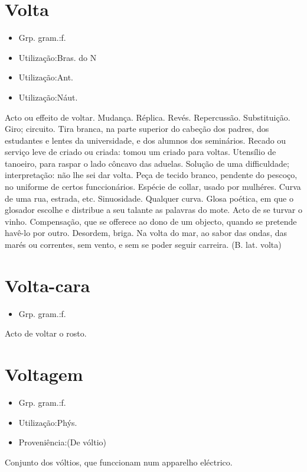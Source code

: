 \documentclass{article}
\begin{document}
\section{Volta}
\begin{itemize}
\item {Grp. gram.:f.}
\end{itemize}
\begin{itemize}
\item {Utilização:Bras. do N}
\end{itemize}
\begin{itemize}
\item {Utilização:Ant.}
\end{itemize}
\begin{itemize}
\item {Utilização:Náut.}
\end{itemize}
Acto ou effeito de voltar.
Mudança.
Réplica.
Revés.
Repercussão.
Substituição.
Giro; circuito.
Tira branca, na parte superior do cabeção dos padres, dos estudantes e lentes da universidade, e dos alumnos dos seminários.
Recado ou serviço leve de criado ou criada: \textunderscore tomou um criado para voltas\textunderscore .
Utensílio de tanoeiro, para raspar o lado côncavo das aduelas.
Solução de uma difficuldade; interpretação: \textunderscore não lhe sei dar volta\textunderscore .
Peça de tecido branco, pendente do pescoço, no uniforme de certos funccionários.
Espécie de collar, usado por mulhéres.
Curva de uma rua, estrada, etc.
Sinuosidade.
Qualquer curva.
Glosa poética, em que o glosador escolhe e distribue a seu talante as palavras do mote.
Acto de se turvar o vinho.
Compensação, que se offerece ao dono de um objecto, quando se pretende havê-lo por outro.
Desordem, briga.
\textunderscore Na volta do mar\textunderscore , ao sabor das ondas, das marés ou correntes, sem vento, e sem se poder seguir carreira.
(B. lat. \textunderscore volta\textunderscore )
\section{Volta-cara}
\begin{itemize}
\item {Grp. gram.:f.}
\end{itemize}
Acto de voltar o rosto.
\section{Voltagem}
\begin{itemize}
\item {Grp. gram.:f.}
\end{itemize}
\begin{itemize}
\item {Utilização:Phýs.}
\end{itemize}
\begin{itemize}
\item {Proveniência:(De \textunderscore vóltio\textunderscore )}
\end{itemize}
Conjunto dos vóltios, que funccionam num apparelho eléctrico.
\end{document}
